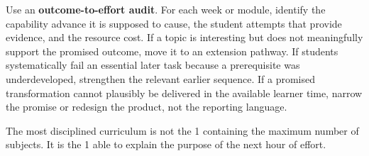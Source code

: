 Use an \textbf{outcome-to-effort audit}. For each week or module, identify the capability advance it is supposed to cause, the student attempts that provide evidence, and the resource cost. If a topic is interesting but does not meaningfully support the promised outcome, move it to an extension pathway. If students systematically fail an essential later task because a prerequisite was underdeveloped, strengthen the relevant earlier sequence. If a promised transformation cannot plausibly be delivered in the available learner time, narrow the promise or redesign the product, not the reporting language.

The most disciplined curriculum is not the 1 containing the maximum number of subjects. It is the 1 able to explain the purpose of the next hour of effort.
